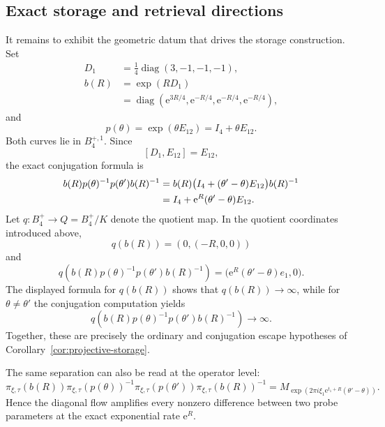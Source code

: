 \documentclass[reqno]{amsart}
\numberwithin{equation}{section}
\theoremstyle{definition}
\theoremstyle{remark}
\newcommand{\e}{\mathrm e}
\begin{document}
\subsection{Exact storage and retrieval directions}

It remains to exhibit the geometric datum that drives the storage
construction.  Set
\[
 \begin{aligned}
 D_1&=\frac14\operatorname{diag}(3,-1,-1,-1),\\
 b(R)&=\exp(RD_1)\\
 &=\operatorname{diag}
 \left(\e^{3R/4},\e^{-R/4},\e^{-R/4},\e^{-R/4}\right),
 \end{aligned}
\]
and
\[
 p(\theta)=\exp(\theta E_{12})=I_4+\theta E_{12}.
\]
Both curves lie in $B_4^{+,1}$.  Since
\[
 [D_1,E_{12}]=E_{12},
\]
the exact conjugation formula is
\begin{align}
 b(R)p(\theta)^{-1}p(\theta')b(R)^{-1}
 &=b(R)\bigl(I_4+(\theta'-\theta)E_{12}\bigr)b(R)^{-1}\notag\\
 &=I_4+\e^R(\theta'-\theta)E_{12}.
 \label{eq:B4-exact-escape}
\end{align}
Let $q:B_4^+\to Q=B_4^+/K$ denote the quotient map.  In the quotient
coordinates introduced above,
\[
 q(b(R))=(0,(-R,0,0))
\]
and
\[
 q\!\left(
 b(R)p(\theta)^{-1}p(\theta')b(R)^{-1}
 \right)
 =\bigl(\e^R(\theta'-\theta)e_1,0\bigr).
\]
The displayed formula for $q(b(R))$ shows that $q(b(R))\to\infty$, while
for $\theta\neq\theta'$ the conjugation computation yields
\[
 q\!\left(
 b(R)p(\theta)^{-1}p(\theta')b(R)^{-1}
 \right)\longrightarrow\infty.
\]
Together, these are precisely the ordinary and conjugation escape hypotheses
of Corollary~\ref{cor:projective-storage}.

The same separation can also be read at the operator level:
\[
 \pi_{\xi,\tau}(b(R))
 \pi_{\xi,\tau}(p(\theta))^{-1}
 \pi_{\xi,\tau}(p(\theta'))
 \pi_{\xi,\tau}(b(R))^{-1}
 =M_{\exp(2\pi i\xi_1\e^{t_1+R}(\theta'-\theta))}.
\]
Hence the diagonal flow amplifies every nonzero difference between two probe
parameters at the exact exponential rate $\e^R$.
\end{document}
